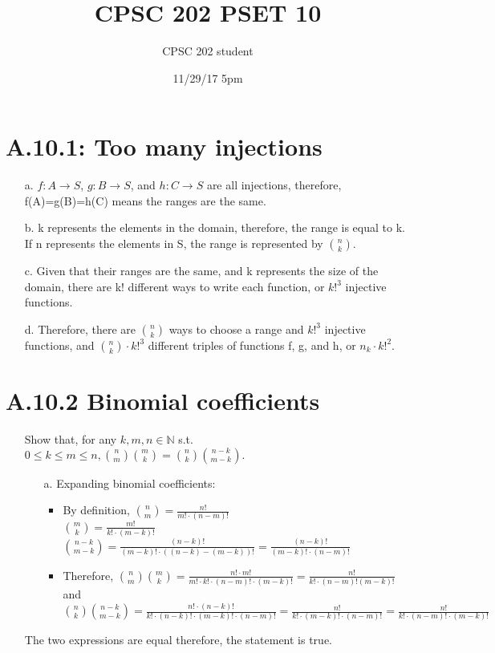 \documentclass[12pt]{article}
\title{CPSC 202 PSET 10}
\author{CPSC 202 student}
\date{11/29/17 5pm}
\begin{document}
\maketitle

\section*{A.10.1: Too many injections}
\begin{enumerate}
  \item[a.] $f: A\rightarrow S$, $g: B\rightarrow S$, and $h: C\rightarrow S$ are all injections, therefore, f(A)=g(B)=h(C) means the ranges are the same.
  \item[b.] k represents the elements in the domain, therefore, the range is equal to k. If n represents the elements in S, the range is represented by $\binom{n}{k}$. 
  \item[c.] Given that their ranges are the same, and k represents the size of the domain, there are k! different ways to write each function, or $k!^3$ injective functions.
\item[d.] Therefore, there are $\binom{n}{k}$ ways to choose a range and $k!^3$ injective functions, and $\binom{n}{k}\cdot k!^3$ different triples of functions f, g, and h, or $n_k\cdot k!^2$.
\end{enumerate}

\section*{A.10.2 Binomial coefficients}
\begin{enumerate}
  \item[] Show that, for any $k, m, n \in \mathbb{N}$ s.t. $0\leq k \leq m\leq n, \binom{n}{m}\binom{m}{k} = \binom{n}{k}\binom{n-k}{m-k}.$ 
    \begin{enumerate}
      \item[a.] Expanding binomial coefficients:
        \begin{itemize}
          \item By definition, $\binom{n}{m} = \frac{n!}{m!\cdot(n-m)!}$
            \\ $\binom{m}{k} = \frac{m!}{k!\cdot(m-k)!}$
            \\ $\binom{n-k}{m-k} = \frac{(n-k)!}{(m-k)!\cdot((n-k)-(m-k))!} = \frac{(n-k)!}{(m-k)!\cdot(n-m)!}$
          \item Therefore, $\binom{n}{m}\binom{m}{k} = \frac{n!\cdot m!}{m!\cdot k!\cdot(n-m)!\cdot(m-k)!}
            = \frac{n!}{k!\cdot(n-m)!(m-k)!}$
            \\and $\binom{n}{k}\binom{n-k}{m-k} = \frac{n!\cdot(n-k)!}{k!\cdot(n-k)!\cdot(m-k)!\cdot(n-m)!}
            = \frac{n!}{k!\cdot(m-k)!\cdot(n-m)!} = \frac{n!}{k!\cdot(n-m)!\cdot(m-k)!}$
        \end{itemize}
    \end{enumerate}
     The two expressions are equal therefore, the statement is true.
\end{enumerate}
\end{document}
